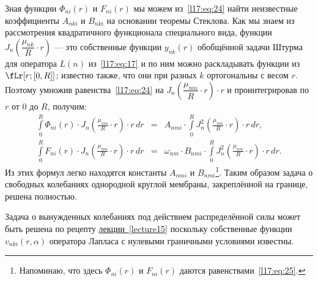 Зная функции $\Phi_{ni}(r)$ и $F_{ni}(r)$ мы можем из~\eqref{l17:eq:24} найти неизвестные коэффициенты $A_{nki}$ и $B_{nki}$ на основании теоремы Стеклова. Как мы знаем из рассмотрения квадратичного функционала специального вида, функции $J_n\left(\dfrac{\mu_{nk}}{R}\cdot r\right)$ --- это собственные функции $y_{nk}(r)$ обобщённой задачи Штурма для оператора $L(n)$ из~\eqref{l17:eq:17} и по ним можно раскладывать функции из $\fLr[r;{[0,R]}]$; известно также, что они при разных $k$ ортогональны с весом $r$. Поэтому умножив равенства~\eqref{l17:eq:24} на $J_n\left(\dfrac{\mu_{nm}}{R}\cdot r\right)\cdot r$ и проинтегрировав по $r$ от $0$ до $R$, получим:
\begin{equation*}
	\begin{array}{rcl}
		\displaystyle\int\limits_{0}^{R}\Phi_{ni}(r)\cdot J_{n}\left(\frac{\mu_{nm}}{R}\cdot r\right)\cdot r\,dr&=&\displaystyle A_{nmi}\cdot\int\limits_{0}^{R}J_{n}^2\left(\frac{\mu_{nm}}{R}\cdot r\right)\cdot r\,dr,\\[18pt]
		\displaystyle \int\limits_{0}^{R}F_{ni}(r)\cdot J_{n}\left(\frac{\mu_{nm}}{R}\cdot r\right)\cdot r\,dr&=&\displaystyle\omega_{nm}\cdot B_{nmi}\cdot\int\limits_{0}^{R}J_{n}^2\left(\frac{\mu_{nm}}{R}\cdot r\right)\cdot r\,dr.
	\end{array}
\end{equation*} 
Из этих формул легко находятся константы $A_{nmi}$ и $B_{nmi}$\footnote{Напоминаю, что здесь $\Phi_{ni}(r)$ и $F_{ni}(r)$ даются равенствами~\eqref{l17:eq:25}.}. Таким образом задача о свободных колебаниях однородной круглой мембраны, закреплённой на границе, решена полностью.

Задача о вынужденных колебаниях под действием распределённой силы может быть решена по рецепту \hyperref[lecture15]{лекции~\ref{lecture15}} поскольку собственные функции $v_{nki}(r,\alpha)$ оператора Лапласа с нулевыми граничными условиями известны.

